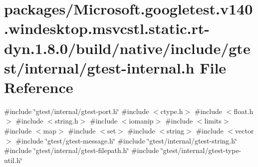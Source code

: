 \hypertarget{gtest-internal_8h}{}\section{packages/\+Microsoft.googletest.\+v140.\+windesktop.\+msvcstl.\+static.\+rt-\/dyn.1.8.0/build/native/include/gtest/internal/gtest-\/internal.h File Reference}
\label{gtest-internal_8h}
{\ttfamily \#include \char`\"{}gtest/internal/gtest-\/port.\+h\char`\"{}}\newline
{\ttfamily \#include $<$ctype.\+h$>$}\newline
{\ttfamily \#include $<$float.\+h$>$}\newline
{\ttfamily \#include $<$string.\+h$>$}\newline
{\ttfamily \#include $<$iomanip$>$}\newline
{\ttfamily \#include $<$limits$>$}\newline
{\ttfamily \#include $<$map$>$}\newline
{\ttfamily \#include $<$set$>$}\newline
{\ttfamily \#include $<$string$>$}\newline
{\ttfamily \#include $<$vector$>$}\newline
{\ttfamily \#include \char`\"{}gtest/gtest-\/message.\+h\char`\"{}}\newline
{\ttfamily \#include \char`\"{}gtest/internal/gtest-\/string.\+h\char`\"{}}\newline
{\ttfamily \#include \char`\"{}gtest/internal/gtest-\/filepath.\+h\char`\"{}}\newline
{\ttfamily \#include \char`\"{}gtest/internal/gtest-\/type-\/util.\+h\char`\"{}}\newline

